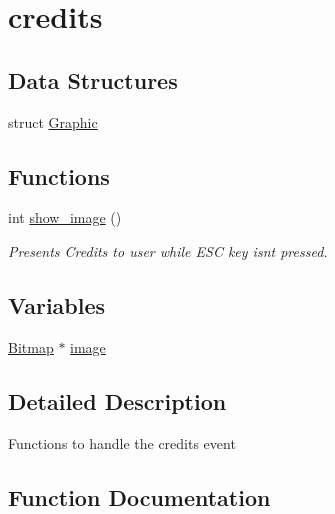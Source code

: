 \hypertarget{group__credits}{}\section{credits}
\label{group__credits}
\subsection*{Data Structures}
\begin{DoxyCompactItemize}
\item 
struct \mbox{\hyperlink{struct_graphic}{Graphic}}
\end{DoxyCompactItemize}
\subsection*{Functions}
\begin{DoxyCompactItemize}
\item 
int \mbox{\hyperlink{group__credits_ga2d90e43cf8b9ee19d3dca31eb1c9cddd}{show\+\_\+image}} ()
\begin{DoxyCompactList}\small\item\em Presents Credits to user while E\+SC key isn\textquotesingle{}t pressed. \end{DoxyCompactList}\end{DoxyCompactItemize}
\subsection*{Variables}
\begin{DoxyCompactItemize}
\item 
\mbox{\hyperlink{struct_bitmap}{Bitmap}} $\ast$ \mbox{\hyperlink{group__credits_ga801bef0ab9d72c95bc5d6d6a0d8f2db0}{image}}
\end{DoxyCompactItemize}


\subsection{Detailed Description}
Functions to handle the credits event 

\subsection{Function Documentation}
\mbox{\label{group__credits_ga2d90e43cf8b9ee19d3dca31eb1c9cddd}} 
